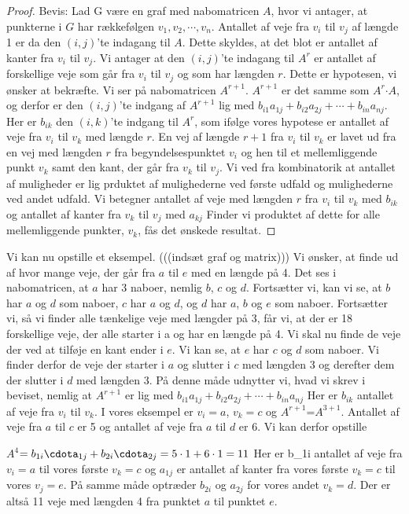 \begin{proof}
Bevis: Lad G være en graf med nabomatricen 
\textbf{$A$}, hvor vi antager, at punkterne i $G$ har rækkefølgen $v_{1},v_{2},\cdots,v_{n}$. Antallet af veje fra $v_{i}$ til $v_{j}$ af længde 1 er da den $(i,j)$'te indagang til 
\textbf{$A$}. Dette skyldes, at det blot er antallet af kanter fra $v_{i}$ til $v_{j}$.
Vi antager at den $(i,j)$'te indagang til 
\textbf{${A^r}$} er antallet af forskellige veje som går fra $v_{i}$ til $v_{j}$ og som har længden $r$. Dette er hypotesen, vi ønsker at bekræfte.
Vi ser på nabomatricen \textbf{$A^{r+1}$}. 
\textbf{$A^{r+1}$} er det samme som 
\textbf{$A^{r}$}$\cdot$\textbf{$A$}, og derfor er den $(i,j)$'te indgang af \textbf{$A^{r+1}$} lig med $b_{i1}a_{1j} + b_{i2}a_{2j} +\cdots+ b_{in}a_{nj}$. Her er $b_{ik}$  den $(i,k)$'te indgang til 
\textbf{$A^{r}$}, som ifølge vores hypotese er antallet af veje fra $v_{i}$ til $v_{k}$ med længde $r$.
En vej af længde $r + 1$ fra $v_{i}$ til $v_{k}$ er lavet ud fra en vej med længden $r$ fra begyndelsespunktet $v_{i}$ og hen til et mellemliggende punkt $v_{k}$ samt den kant, der går fra $v_{k}$ til $v_{j}$. Vi ved fra kombinatorik at antallet af muligheder er lig prduktet af mulighederne ved første udfald og mulighederne ved andet udfald. Vi betegner antallet af veje med længden $r$ fra $v_{i}$ til $v_{k}$ med $b_{ik}$ og antallet af kanter fra $v_{k}$ til $v_{j}$ med $a_{kj}$ Finder vi produktet af dette for alle mellemliggende punkter, $v_{k}$, fås det ønskede resultat.
\end{proof}
Vi kan nu opstille et eksempel. 
(((indsæt graf og matrix)))
Vi ønsker, at finde ud af hvor mange veje, der går fra $a$ til $e$ med en længde på 4. Det ses i nabomatricen, at $a$ har 3 naboer, nemlig $b$, $c$ og $d$. Fortsætter vi, kan vi se, at $b$ har $a$ og $d$ som naboer, $c$ har $a$ og $d$, og $d$ har $a$, $b$ og $e$ som naboer. Fortsætter vi, så vi finder alle tænkelige veje med længder på 3, får vi, at der er 18 forskellige veje, der alle starter i a og har en længde på 4. Vi skal nu finde de veje der ved at tilføje en kant ender i $e$. Vi kan se, at $e$ har $c$ og $d$ som naboer. Vi finder derfor de veje der starter i $a$ og slutter i $c$ med længden 3 og derefter dem der slutter i $d$ med længden 3. På denne måde udnytter vi, hvad vi skrev i beviset, nemlig at
\textbf{$A^{r+1}$} er lig med $b_{i1}a_{1j} + b_{i2}a_{2j} +\cdots+ b_{in}a_{nj}$
Her er $b_{ik}$ antallet af veje fra $v_{i}$ til ${v_k}$. I vores eksempel er $v_{i}=a$, ${v_k}=c$ og \textbf{$A^{r+1}$}=\textbf{$A^{3+1}$}. Antallet af veje fra $a$ til $c$ er 5 og antallet af veje fra $a$ til $d$ er 6. Vi kan derfor opstille

\textbf{$A^{4}$}$=b_{1i}\cdota_{1j}+b_{2i}\cdota_{2j}=5\cdot1+6\cdot1=11$
Her er b_{1i} antallet af veje fra $v_{i}=a$ til vores første $v_{k}=c$ og $a_{1j}$ er antallet af kanter fra vores første $v_{k}=c$ til vores $v_{j}=e$. På samme måde optræder $b_{2i}$ og $a_{2j}$ for vores andet $v_{k}=d$. Der er altså 11 veje med længden 4 fra punktet $a$ til punktet $e$.

